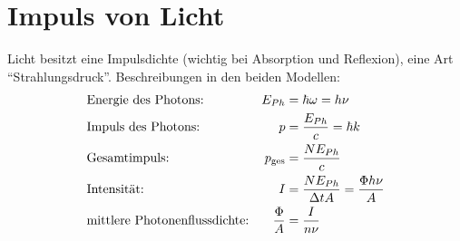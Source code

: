 \section{Impuls von Licht}
Licht besitzt eine Impulsdichte (wichtig bei Absorption und
Reflexion), eine Art \enquote{Strahlungsdruck}. Beschreibungen in den
beiden Modellen:
\begin{align*}
  &\text{Energie des Photons:\index{Photonenenergie}} 
  & E_{Ph}&=\hbar\omega=h\nu\\
  &\text{Impuls des Photons:\index{Photonenimpuls}} 
  & p &= \frac{E_{Ph}}{c}=\hbar k\\
  &\text{Gesamtimpuls:} 
  & p_\text{ges} &= \frac{N E_{Ph}}{c}\\
  &\text{Intensität:} 
  & I &= \frac{N E_{Ph}}{\Delta t A} = \frac{\Phi h \nu}{A}\\
  &\text{mittlere Photonenflussdichte:\index{Photonenflussdichte}} 
  &\frac{\Phi}{A} &= \frac{I}{n\nu}\\
\end{align*}%
%
%
%
%



